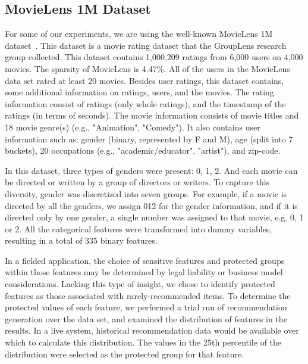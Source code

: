    \subsection{MovieLens 1M Dataset}
    For some of our experiments, we are using the well-known MovieLens 1M dataset~\cite{movielens}. This dataset is a movie rating dataset that the GroupLens research group collected. This dataset contains 1,000,209 ratings from 6,000 users on 4,000 movies. The sparsity of MovieLens is 4.47\%. All of the users in the MovieLens data set rated at least 20 movies.
    Besides user ratings, this dataset contains, some additional information on ratings, users, and the movies. The rating information consist of ratings (only whole ratings), and the timestamp of the ratings (in terms of seconds). The movie information consists of movie titles and 18 movie genre(s) (e.g., "Animation", "Comedy"). It also contains user information such as: gender (binary, represented by F and M), age (split into 7 buckets), 20 occupations (e.g., "academic/educator", "artist"), and zip-code.
    
    
     In this dataset, three types of genders were present: 0, 1, 2. And each movie can be directed or written by a group of directors or writers. To capture this diversity, gender was discretized into seven groups. For example, if a movie is directed by all the genders, we assign 012 for the gender information, and if it is directed only by one gender, a single number was assigned to that movie, e.g. 0, 1 or 2. All the categorical features were transformed into dummy variables, resulting in a total of 335 binary features.
    
    In a fielded application, the choice of sensitive features and protected groups within those features may be determined by legal liability or business model considerations. Lacking this type of insight, we chose to identify protected features as those associated with rarely-recommended items. To determine the protected values of each feature, we performed a trial run of recommendation generation over the data set, and examined the distribution of features in the results. In a live system, historical recommendation data would be available over which to calculate this distribution. The values in the 25th percentile of the distribution were selected as the protected group for that feature.

